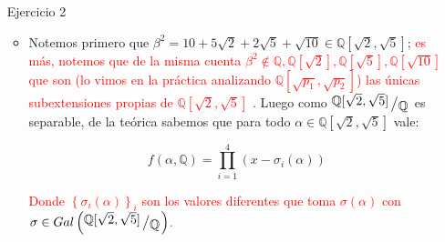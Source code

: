 \documentclass[11pt]{article}
\newcommand{\Q}{\mathbb{Q}}
\newcommand{\sett}[1]{\left\lbrace#1\right\rbrace}
\newcommand{\quotient}[2]{{\raisebox{.2em}{$#1$}\left/\raisebox{-.2em}{$#2$}\right.}}
\numberwithin{theorem}{subsection}
\newcommand{\qed}{\nobreak \ifvmode \relax \else
	\ifdim\lastskip<1.5em \hskip-\lastskip
	\hskip1.5em plus0em minus0.5em \fi \nobreak
	\vrule height0.75em width0.5em depth0.25em\fi}
\begin{document}
\begin{enumerate}
\begin{itemize}
	\begin{equation*}
		\begin{aligned}
			\dfrac{\left(t^{37^2} - t\right)^{38}}{\left(t^{37} - t\right)^{37^2 + 1}} = & \dfrac{t^{q+1}\left(t^{q^2 -1} - 1\right)^{q+1}}{t^{q^2 + 1}\left(t^{q-1} - 1\right)^{q^2 + 1}} \\
			= & \dfrac{\left( \left(t^{q -1} \right)^{q+1} - 1\right)^{q+1}}{t^{q^2 - q} \left(t^{q-1} - 1\right)^{q^2 + 1}} \\
			= & \dfrac{\left( \left(t^{q -1} \right) - 1\right)^{q+1} \left(\sum\limits_{r=0}^{q}{t^{(q-1)r}}\right)^{q+1}}{t^{q^2 - q} \left(t^{q-1} - 1\right)^{q^2 + 1}}  \\
			= & \dfrac{\left(\sum\limits_{r=0}^{q}{t^{(q-1)r}}\right)^{q+1}}{t^{q^2 - q} \left(t^{q-1} - 1\right)^{q^2 -q}}  \\
			= & \frac{g}{h} \qquad \text{pues } (g,h) = 1
		\end{aligned}
	\end{equation*}
	
	Y finalmente $\max \left\lbrace gr(g), gr(h) \right\rbrace = \max \sett{\underbrace{q^2 - q + \left(q-1\right)\left(q^2 - q\right)}_{q^3 - q^2}, \underbrace{(q-1)q(q+1)}_{q^3 - q}} = q^3 - q$, luego conlcuimos que $E^G = \mathbb{F}_{37}(f)$. \qed
	
	\end{itemize}
	
	\item[Ejercicio 2] 
	
	\begin{itemize}
		\item Notemos primero que $\beta^2 = 10 + 5\sqrt{2} + 2\sqrt{5} + \sqrt{10} \in \Q[\sqrt{2}, \sqrt{5 }]$; \textcolor{red}{
			 es m\'as, notemos que de la misma cuenta $\beta^2 \not\in  \Q,  \Q[\sqrt{2}],  \Q[\sqrt{5 }], \Q[\sqrt{10}]$ que son (lo vimos en la pr\'actica analizando $\Q[\sqrt{p_1}, \sqrt{p_2}]$) las \'unicas subextensiones propias de $\Q[\sqrt{2}, \sqrt{5}]$ 
		 }. Luego como $\quotient{\Q[\sqrt{2}, \sqrt{5 }]}{\Q}$ es separable, de la te\'orica sabemos que para todo $\alpha \in \Q[\sqrt{2}, \sqrt{5 }]$ vale:
		
		\begin{equation*}
			f \left(\alpha, \Q\right) = \prod\limits_{i=1}^{4} \left(x - \sigma_i(\alpha)\right)
		\end{equation*}
		
		\textcolor{red}{Donde $\sett{\sigma_i(\alpha)}_i$ son los valores diferentes que toma $\sigma(\alpha)$ con  $\sigma \in Gal \left(\quotient{\Q[\sqrt{2}, \sqrt{5 }]}{\Q}\right)$.}
		

\end{itemize}
\end{enumerate}
\end{document}
